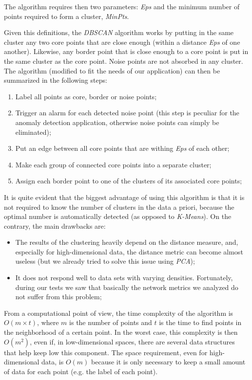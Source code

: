 \documentclass[12pt,a4paper,cucitura]{toptesi}
\begin{document}
The algorithm requires then two parameters: \emph{Eps} and the minimum number of points required to form a cluster, \emph{MinPts}.

Given this definitions, the \emph{DBSCAN} algorithm works by putting in the same cluster any two core points that are close enough (within a distance \emph{Eps} of one another). Likewise, any border point that is close enough to a core point is put in the same cluster as the core point. Noise points are not absorbed in any cluster.
The algorithm (modified to fit the needs of our application) can then be summarized in the following steps:

\begin{enumerate}
\item Label all points as core, border or noise points;
\item Trigger an alarm for each detected noise point (this step is peculiar for the anomaly detection application, otherwise noise points can simply be eliminated);
\item  Put an edge between all core points that are withing \emph{Eps} of each other;
\item Make each group of connected core points into a separate cluster;
\item Assign each border point to one of the clusters of its associated core points;
\end{enumerate}

It is quite evident that the biggest advantage of using this algorithm is that it is not required to know the number of clusters in the data a priori, because the optimal number is automatically detected (as opposed to \emph{K-Means}). On the contrary, the main drawbacks are:

\begin{itemize}
\item The results of the clustering heavily depend on the distance measure, and, especially for high-dimensional data, the distance metric can become almost useless (but we already tried to solve this issue using \emph{PCA});
\item It does not respond well to data sets with varying densities. Fortunately, during our tests we saw that basically the network metrics we analyzed do not suffer from this problem;
\end{itemize}

From a computational point of view, the time complexity of the algorithm is $O(m \times t)$, where $m$ is the number of points and $t$ is the time to find points in the neighborhood of a certain point. In the worst case, this complexity is then $O(m^2)$, even if, in low-dimensional spaces, there are several data structures that help keep low this component. The space requirement, even for high-dimensional data, is $O(m)$ because it is only necessary to keep a small amount of data for each point (e.g. the label of each point).
\end{document}
